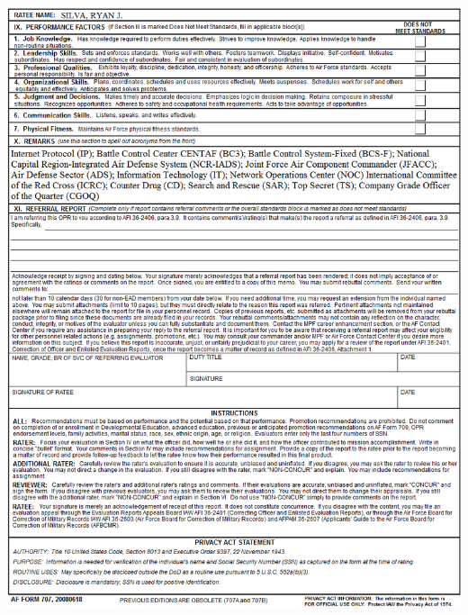 \documentclass{article}
\begin{document}
\includegraphics[scale=.65]{DeployOPRb}


%
\end{document}
